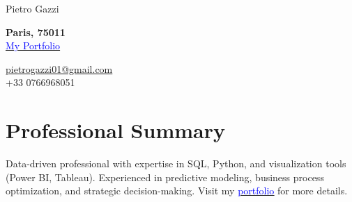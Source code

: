 \documentclass[letterpaper,10.5pt]{article}
\begin{document}
\begin{center}
    {\LARGE Pietro Gazzi}\\
        \begin{multicols}{2}
        \begin{flushleft}
            \textbf{Paris, 75011}\\
            \href{https://pietrowei.github.io/Portfolio}{\underline{\textcolor{blue}{My Portfolio}}}
        \end{flushleft}
        \begin{flushright}
            \href{mailto:pietrogazzi01@gmail.com}{pietrogazzi01@gmail.com}\\
            +33 0766968051
        \end{flushright}
    \end{multicols}
\end{center}

\section*{Professional Summary}\vspace{-5pt}
Data-driven professional with expertise in SQL, Python, and visualization tools (Power BI, Tableau). Experienced in predictive modeling, business process optimization, and strategic decision-making. Visit my \href{https://pietrowei.github.io/Portfolio}{\underline{\textcolor{blue}{portfolio}}} for more details.
\end{document}
